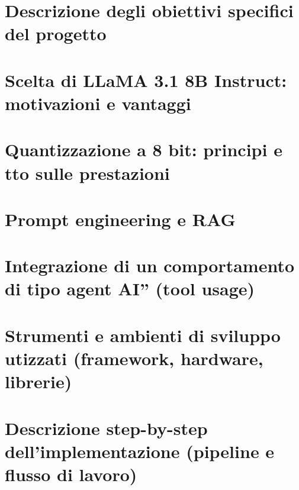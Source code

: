 \section{Descrizione degli obiettivi specifici del progetto}
\section{Scelta di LLaMA 3.1 8B Instruct: motivazioni e vantaggi}
\section{Quantizzazione a 8 bit: principi e tto sulle prestazioni}
\section{Prompt engineering e RAG}
\section{Integrazione di un comportamento di tipo agent AI” (tool usage)}
\section{Strumenti e ambienti di sviluppo utizzati (framework, hardware, librerie)}
\section{Descrizione step-by-step dell’implementazione (pipeline e flusso di lavoro)}